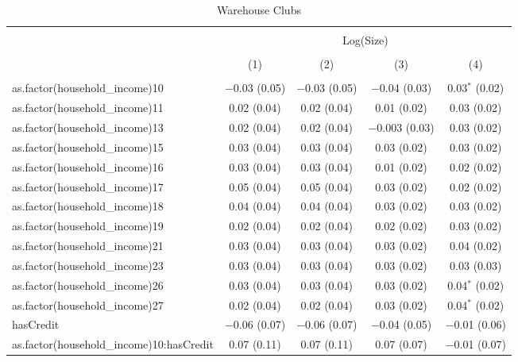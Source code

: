 
\begin{table}[!htbp] \centering 
  \caption{Warehouse Clubs} 
  \label{tab:packageSizeWarehouseLiqAppendix} 
\begin{tabular}{@{\extracolsep{5pt}}lcccc} 
\\[-1.8ex]\hline 
\hline \\[-1.8ex] 
 & \multicolumn{4}{c}{Log(Size)} \\ 
\\[-1.8ex] & (1) & (2) & (3) & (4)\\ 
\hline \\[-1.8ex] 
 as.factor(household\_income)10 & $-$0.03 (0.05) & $-$0.03 (0.05) & $-$0.04 (0.03) & 0.03$^{*}$ (0.02) \\ 
  as.factor(household\_income)11 & 0.02 (0.04) & 0.02 (0.04) & 0.01 (0.02) & 0.03 (0.02) \\ 
  as.factor(household\_income)13 & 0.02 (0.04) & 0.02 (0.04) & $-$0.003 (0.03) & 0.03 (0.02) \\ 
  as.factor(household\_income)15 & 0.03 (0.04) & 0.03 (0.04) & 0.03 (0.02) & 0.03 (0.02) \\ 
  as.factor(household\_income)16 & 0.03 (0.04) & 0.03 (0.04) & 0.01 (0.02) & 0.02 (0.02) \\ 
  as.factor(household\_income)17 & 0.05 (0.04) & 0.05 (0.04) & 0.03 (0.02) & 0.02 (0.02) \\ 
  as.factor(household\_income)18 & 0.04 (0.04) & 0.04 (0.04) & 0.03 (0.02) & 0.03 (0.02) \\ 
  as.factor(household\_income)19 & 0.02 (0.04) & 0.02 (0.04) & 0.02 (0.02) & 0.03 (0.02) \\ 
  as.factor(household\_income)21 & 0.03 (0.04) & 0.03 (0.04) & 0.03 (0.02) & 0.04 (0.02) \\ 
  as.factor(household\_income)23 & 0.03 (0.04) & 0.03 (0.04) & 0.03 (0.02) & 0.03 (0.03) \\ 
  as.factor(household\_income)26 & 0.03 (0.04) & 0.03 (0.04) & 0.03 (0.02) & 0.04$^{*}$ (0.02) \\ 
  as.factor(household\_income)27 & 0.02 (0.04) & 0.02 (0.04) & 0.03 (0.02) & 0.04$^{*}$ (0.02) \\ 
  hasCredit & $-$0.06 (0.07) & $-$0.06 (0.07) & $-$0.04 (0.05) & $-$0.01 (0.06) \\ 
  as.factor(household\_income)10:hasCredit & 0.07 (0.11) & 0.07 (0.11) & 0.07 (0.07) & $-$0.01 (0.07) \\ 

\end{tabular}
\end{table}
